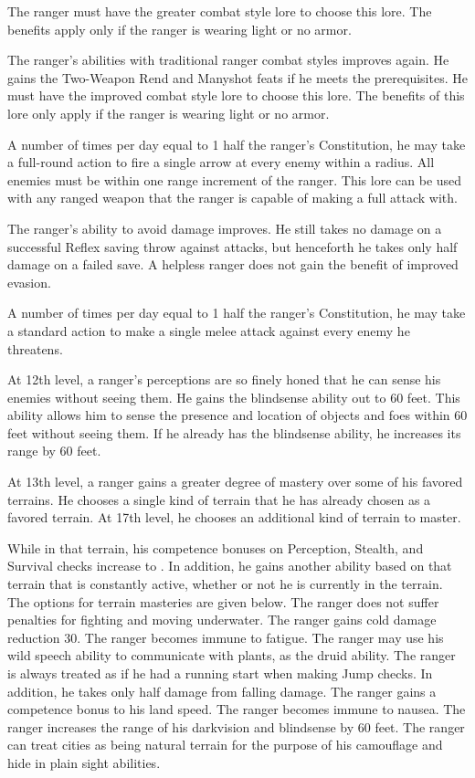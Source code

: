 The ranger must have the greater combat style lore to choose this lore. The benefits apply only if the ranger is wearing light or no armor.

 The ranger's abilities with traditional ranger combat styles improves again. He gains the Two-Weapon Rend and Manyshot feats if he meets the prerequisites. He must have the improved combat style lore to choose this lore. The benefits of this lore only apply if the ranger is wearing light or no armor.

 A number of times per day equal to 1 \add half the ranger's Constitution, he may take a full-round action to fire a single arrow at every enemy within a \areamed radius. All enemies must be within one range increment of the ranger. This lore can be used with any ranged weapon that the ranger is capable of making a full attack with.

 The ranger's ability to avoid damage improves. He still takes no damage on a successful Reflex saving throw against attacks, but henceforth he takes only half damage on a failed save. A helpless ranger does not gain the benefit of improved evasion.

 A number of times per day equal to 1 \add half the ranger's Constitution, he may take a standard action to make a single melee attack against every enemy he threatens.

 At 12th level, a ranger's perceptions are so finely honed that he can sense his enemies without seeing them. He gains the blindsense ability out to 60 feet. This ability allows him to sense the presence and location of objects and foes within 60 feet without seeing them. If he already has the blindsense ability, he increases its range by 60 feet.

 At 13th level, a ranger gains a greater degree of mastery over some of his favored terrains. He chooses a single kind of terrain that he has already chosen as a favored terrain. At 17th level, he chooses an additional kind of terrain to master.
\par While in that terrain, his competence bonuses on Perception, Stealth, and Survival checks increase to . In addition, he gains another ability based on that terrain that is constantly active, whether or not he is currently in the terrain. The options for terrain masteries are given below.
 The ranger does not suffer penalties for fighting and moving underwater.
 The ranger gains cold damage reduction 30.
 The ranger becomes immune to fatigue.
 The ranger may use his wild speech ability to communicate with plants, as the druid ability.
 The ranger is always treated as if he had a running start when making Jump checks. In addition, he takes only half damage from falling damage.
 The ranger gains a  competence bonus to his land speed.
 The ranger becomes immune to nausea.
 The ranger increases the range of his darkvision and blindsense by 60 feet.
 The ranger can treat cities as being natural terrain for the purpose of his camouflage and hide in plain sight abilities.

